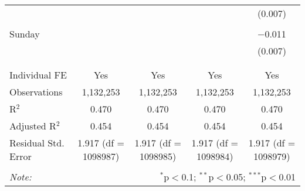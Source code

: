 \documentclass[
]{article}
\begin{document}
\begin{table}[!htbp]
{\begin{tabular}{@{\extracolsep{5pt}}lcccc}
  &  &  &  & (0.007) \\ 
  & & & & \\ 
 Sunday &  &  &  & $-$0.011 \\ 
  &  &  &  & (0.007) \\ 
  & & & & \\ 
\hline \\[-1.8ex] 
Individual FE & Yes & Yes & Yes & Yes \\ 
Observations & 1,132,253 & 1,132,253 & 1,132,253 & 1,132,253 \\ 
R$^{2}$ & 0.470 & 0.470 & 0.470 & 0.470 \\ 
Adjusted R$^{2}$ & 0.454 & 0.454 & 0.454 & 0.454 \\ 
Residual Std. Error & 1.917 (df = 1098987) & 1.917 (df = 1098985) & 1.917 (df = 1098984) & 1.917 (df = 1098979) \\ 
\hline 
\hline \\[-1.8ex] 
\textit{Note:}  & \multicolumn{4}{r}{$^{*}$p$<$0.1; $^{**}$p$<$0.05; $^{***}$p$<$0.01} \\ 
\end{tabular}
} 
\end{table} 
\newpage
\end{document}
